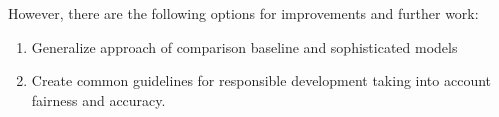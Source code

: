     However, there are the following options for improvements and further work:
    \begin{enumerate}
        \item Generalize approach of comparison baseline and sophisticated models
        \item Create common guidelines for responsible development taking into account fairness and accuracy.
    \end{enumerate}




